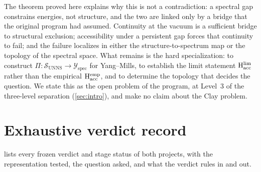 \documentclass[11pt,a4paper]{article}
\theoremstyle{definition}
\theoremstyle{remark}
\newcommand{\SUNNS}{\mathcal{S}_{\mathrm{UNNS}}}
\newcommand{\Yspec}{\mathcal{Y}_{\mathrm{spec}}}
\newcommand{\Hacc}{\mathrm{H}_{\mathrm{acc}}}
\begin{document}
The theorem proved here explains why this is not a contradiction: a spectral gap constrains energies, not structure, and the two are linked only by a bridge that the original program had assumed. Continuity at the vacuum is a sufficient bridge to structural exclusion; accessibility under a persistent gap forces that continuity to fail; and the failure localizes in either the structure-to-spectrum map or the topology of the spectral space. What remains is the hard specialization: to construct $\Pi:\SUNNS\to\Yspec$ for Yang--Mills, to establish the limit statement $\Hacc^{\rm lim}$ rather than the empirical $\Hacc^{\rm emp}$, and to determine the topology that decides the question. We state this as the open problem of the program, at Level~3 of the three-level separation (\cref{sec:intro}), and make no claim about the Clay problem.

\appendix
\section{Exhaustive verdict record}\label{app:record}
 lists every frozen verdict and stage status of both projects, with the representation tested, the question asked, and what the verdict rules in and out.
\end{document}
